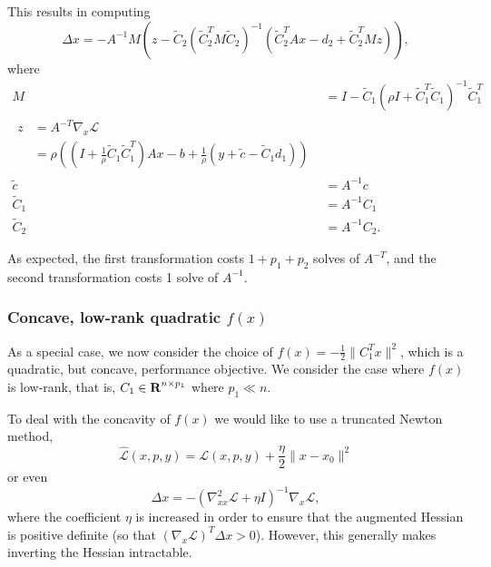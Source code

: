 \documentclass{article}
\newcommand{\inv}[1]{\frac{1}{#1}}
\newcommand{\tC}{\tilde{C}}
\begin{document}
This results in computing
    \begin{equation}
    \Delta x = -A^{-1} M (z - 
        \tC_2 (\tC_2^T M \tC_2)^{-1}(\tC_2^T Ax - d_2 + \tC_2^T Mz)),
    \end{equation}
    where 
    \begin{subequations}\begin{align}
    M &= I - \tC_1(\rho I + \tC_1^T\tC_1)^{-1}\tC_1^T \\
    \begin{split}
    z &= A^{-T} \nabla_x \mathcal{L} \\
      &= \rho((I + \inv{\rho}\tC_1\tC_1^T)Ax
        - b + \inv{\rho}(y +\tilde{c} - \tC_1 d_1))
    \end{split} \\
    \tilde{c} &= A^{-1} c \\
    \tC_1 &= A^{-1} C_1 \\
    \tC_2 &= A^{-1} C_2. 
    \end{align}\end{subequations}

As expected, the first transformation costs $1 + p_1 + p_2$ solves of $A^{-T}$,
    and the second transformation costs 1 solve of $A^{-1}$.

\subsubsection{Concave, low-rank quadratic $f(x)$}
As a special case, we now consider the choice of 
    $f(x) = - \frac{1}{2}\|C_1^T x \|^2$,
    which is a quadratic, but concave, performance objective.
We consider the case where $f(x)$ is low-rank, that is,
    $C_1 \in {\mbox{\bf R}}^{n \times p_1}$ where $p_1 \ll n$.

To deal with the concavity of $f(x)$ we would like to use
    a truncated Newton method,
    \begin{equation}
    \hat{\mathcal{L}}(x,p,y) = \mathcal{L}(x,p,y) + \frac{\eta}{2} \|x - x_0\|^2
    \end{equation}
    or even
    \begin{equation}
    \Delta x = -(\nabla_{xx}^2 \mathcal{L} + \eta I)^{-1}
        \nabla_x \mathcal{L},
    \end{equation}
    where the coefficient $\eta$ is increased in order to 
    ensure that the augmented Hessian is positive definite 
    (so that $(\nabla_x\mathcal{L})^T\Delta x > 0$).
However, this generally makes inverting the Hessian intractable.
\end{document}
